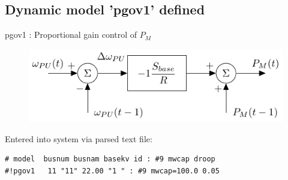 \documentclass[14pt, unknownkeysallowed]{beamer}
\begin{document}
\subsection{Dynamic model 'pgov1' defined}
\begin{frame}[fragile]
pgov1 : Proportional gain control of $P_M$ \\
\begin{figure}
	\includegraphics[width=\linewidth]{pgov1}
\end{figure}
Entered into system via parsed text file:
\begin{lstlisting}[basicstyle=\footnotesize]
# model  busnum busnam basekv id : #9 mwcap droop
#!pgov1   11 "11" 22.00 "1 " : #9 mwcap=100.0 0.05
\end{lstlisting}
\end{frame}

\end{document}
